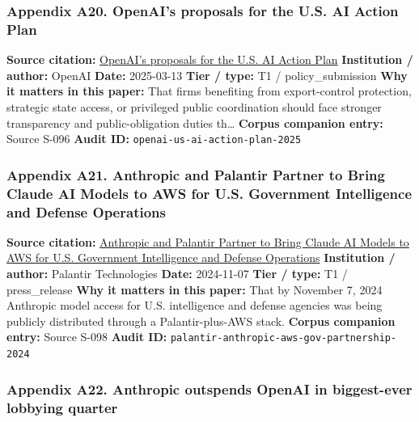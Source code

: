 \documentclass[
  american,
  11pt,
  letterpaper,
]{article}
\begin{document}
\subsubsection{Appendix A20. OpenAI's proposals for the U.S. AI Action
Plan}\label{ch-10-appendix-a20-openais-proposals-for-the-us-ai-action-plan}

\textbf{Source citation:}
\href{https://openai.com/global-affairs/openai-proposals-for-the-us-ai-action-plan/}{OpenAI's
proposals for the U.S. AI Action Plan} \textbf{Institution / author:}
OpenAI \textbf{Date:} 2025-03-13 \textbf{Tier / type:} T1 /
policy\_submission \textbf{Why it matters in this paper:} That firms
benefiting from export-control protection, strategic state access, or
privileged public coordination should face stronger transparency and
public-obligation duties th\ldots{} \textbf{Corpus companion entry:}
Source S-096 \textbf{Audit ID:} \texttt{openai-us-ai-action-plan-2025}

\subsubsection{Appendix A21. Anthropic and Palantir Partner to Bring
Claude AI Models to AWS for U.S. Government Intelligence and Defense
Operations}\label{ch-10-appendix-a21-anthropic-and-palantir-partner-to-bring-claude-ai-models-to-aws-for-u-s-government-intelligence-and-defense-operations}

\textbf{Source citation:}
\href{https://investors.palantir.com/news-details/2024/Anthropic-and-Palantir-Partner-to-Bring-Claude-AI-Models-to-AWS-for-U.S.-Government-Intelligence-and-Defense-Operations/}{Anthropic
and Palantir Partner to Bring Claude AI Models to AWS for U.S.
Government Intelligence and Defense Operations} \textbf{Institution /
author:} Palantir Technologies \textbf{Date:} 2024-11-07 \textbf{Tier /
type:} T1 / press\_release \textbf{Why it matters in this paper:} That
by November 7, 2024 Anthropic model access for U.S. intelligence and
defense agencies was being publicly distributed through a
Palantir-plus-AWS stack. \textbf{Corpus companion entry:} Source S-098
\textbf{Audit ID:} \texttt{palantir-anthropic-aws-gov-partnership-2024}

\subsubsection{Appendix A22. Anthropic outspends OpenAI in biggest-ever
lobbying
quarter}\label{ch-10-appendix-a22-anthropic-outspends-openai-in-biggest-ever-lobbying-quarter}
\end{document}
